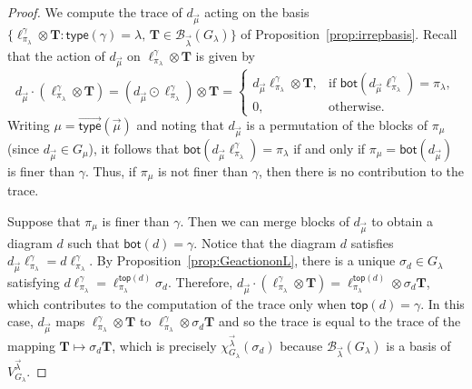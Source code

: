 \documentclass[10pt]{amsart}
\theoremstyle{definition}
\theoremstyle{remark}
\newcommand{\vtype}{\overrightarrow{\mathsf{type}}}
\begin{document}
\begin{proof}
We compute the trace of $d_{\vec{\mu}}$ acting on the basis
$\{ \ell_{\pi_\lambda}^\gamma \otimes \mathbf{T} :
    \mathsf{type}(\gamma) = \lambda, \,
    \mathbf{T} \in \mathcal{B}_{\vec{\lambda}}(G_\lambda) \}$
of Proposition~\ref{prop:irrepbasis}.
Recall that the action of $d_{\vec{\mu}}$ on $\ell_{\pi_\lambda}^\gamma \otimes \mathbf{T}$
is given by
\begin{equation*}
    d_{\vec{\mu}} \cdot (\ell_{\pi_\lambda}^\gamma \otimes \mathbf{T})
    = (d_{\vec{\mu}} \odot \ell_{\pi_\lambda}^\gamma) \otimes \mathbf{T}
    =
    \begin{cases}
        d_{\vec{\mu}} \ell_{\pi_\lambda}^\gamma \otimes \mathbf{T}, & \text{if~} \mathsf{bot}(d_{\vec{\mu}} \ell_{\pi_\lambda}^\gamma) = \pi_\lambda,\\
        0, & \text{otherwise.}
    \end{cases}
\end{equation*}
Writing $\mu = \vtype(\vec{\mu})$ and noting that $d_{\vec{\mu}}$ is
a permutation of the blocks of $\pi_\mu$ (since $d_{\vec{\mu}} \in G_\mu$),
it follows that $\mathsf{bot}(d_{\vec{\mu}} \ell_{\pi_\lambda}^\gamma) = \pi_\lambda$
if and only if $\pi_\mu = \mathsf{bot}(d_{\vec{\mu}})$ is finer than $\gamma$.
Thus, if $\pi_\mu$ is not finer than $\gamma$, then there is no contribution to
the trace.

Suppose that $\pi_\mu$ is finer than $\gamma$. Then we can merge blocks of
$d_{\vec{\mu}}$ to obtain a diagram $d$ such that $\mathsf{bot}(d) = \gamma$.
Notice that the diagram $d$ satisfies
$d_{\vec{\mu}} \ell_{\pi_\lambda}^\gamma = d \ell_{\pi_\lambda}^\gamma$.
By Proposition~\ref{prop:GeactiononL}, there is a unique $\sigma_{d} \in G_\lambda$
satisfying $d \ell_{\pi_\lambda}^\gamma = \ell_{\pi_\lambda}^{\mathsf{top}(d)} \sigma_{d}$.
Therefore, $d_{\vec{\mu}} \cdot (\ell_{\pi_\lambda}^\gamma \otimes \mathbf{T})
= \ell_{\pi_\lambda}^{\mathsf{top}(d)} \otimes \sigma_{d} \mathbf{T}$,
which contributes to the computation of the trace only when $\mathsf{top}(d) = \gamma$.
In this case,
$d_{\vec{\mu}}$ maps $\ell_{\pi_\lambda}^\gamma \otimes \mathbf{T}$
to $\ell_{\pi_\lambda}^\gamma \otimes \sigma_d \mathbf{T}$ and so
the trace is equal to the trace of the mapping
$\mathbf{T} \mapsto \sigma_d \mathbf{T}$,
which is precisely $\chi^{\vec{\lambda}}_{G_\lambda}(\sigma_{d})$
because $\mathcal{B}_{\vec{\lambda}}(G_\lambda)$
is a basis of $V^{\vec{\lambda}}_{G_\lambda}$.
\end{proof}
\end{document}
